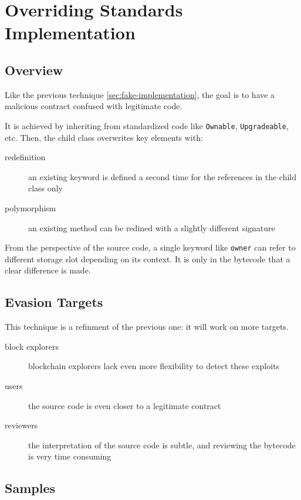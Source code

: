 \section{Overriding Standards Implementation}

\subsection{Overview}

Like the previous technique \ref{sec:fake-implementation}, the goal is to have a malicious contract confused with legitimate code.

It is achieved by inheriting from standardized code like \lstinline{Ownable}, \lstinline{Upgradeable}, etc.
Then, the child class overwrites key elements with:

\begin{description}
\item[redefinition]{an existing keyword is defined a second time for the references in the child class only}
\item[polymorphism]{an existing method can be redined with a slightly different signature}
\end{description}

From the perspective of the source code, a single keyword like \lstinline{owner} can refer to different storage slot depending on its context.
It is only in the bytecode that a clear difference is made.

\subsection{Evasion Targets}

This technique is a refinment of the previous one: it will work on more targets.

\begin{description}
\item[block explorers]{blockchain explorers lack even more flexibility to detect these exploits}
\item[users]{the source code is even closer to a legitimate contract}
\item[reviewers]{the interpretation of the source code is subtle, and reviewing the bytecode is very time consuming}
\end{description}

\subsection{Samples}

